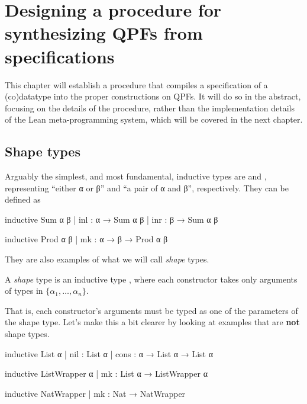 
\chapter{Designing a procedure for synthesizing QPFs from specifications}%
\label{ch:procedure}

This chapter will establish a procedure that compiles a specification of a (co)datatype
into the proper constructions on QPFs.
It will do so in the abstract, focusing on the details of the procedure, rather than the implementation
details of the Lean meta-programming system, which will be covered in the next chapter.


\section{Shape types}%
\label{sec:shape_types}

Arguably the simplest, and most fundamental, inductive types are  and ,
representing ``either α or β'' and ``a pair of α and β'', respectively.
They can be defined as

\begin{center}
\begin{minipage}[t]{0.45\linewidth}
    \begin{leancode}
inductive Sum α β
  | inl : α → Sum α β
  | inr : β → Sum α β
    \end{leancode}
\end{minipage}
\begin{minipage}[t]{0.45\linewidth}
    \begin{leancode}    
inductive Prod α β
  | mk : α → β → Prod α β
    \end{leancode}
\end{minipage}
\end{center}

They are also examples of what we will call \emph{shape} types.
\begin{definition}
    A \emph{shape} type is an inductive type , 
    where each constructor takes only arguments of types in $\{α_1, \ldots, α_n\}$.
\end{definition}
That is, each constructor's arguments must be typed as one of the parameters of the shape type.
Let's make this a bit clearer by looking at examples that are \textbf{not} shape types. 

\begin{leancode}
  inductive List α
    | nil  : List α 
    | cons : α → List α → List α

  inductive ListWrapper α
    | mk : List α → ListWrapper α

  inductive NatWrapper
    | mk : Nat → NatWrapper
\end{leancode}

